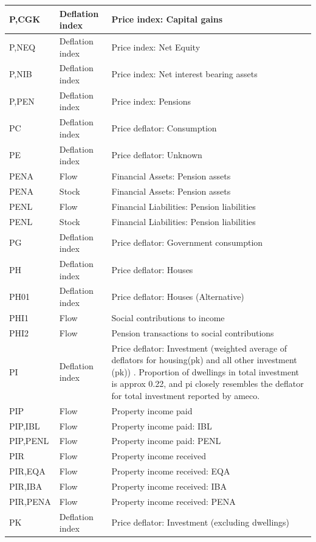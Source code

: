 \documentclass[
]{book}
\begin{document}
\begin{tabular}[t]{l|l|l}
\hline
P,CGK & Deflation index & Price index: Capital gains\\
\hline
P,NEQ & Deflation index & Price index: Net Equity\\
\hline
P,NIB & Deflation index & Price index: Net interest bearing assets\\
\hline
P,PEN & Deflation index & Price index: Pensions\\
\hline
PC & Deflation index & Price deflator: Consumption\\
\hline
PE & Deflation index & Price deflator: Unknown\\
\hline
PENA & Flow & Financial Assets: Pension assets\\
\hline
PENA & Stock & Financial Assets: Pension assets\\
\hline
PENL & Flow & Financial Liabilities: Pension liabilities\\
\hline
PENL & Stock & Financial Liabilities: Pension liabilities\\
\hline
PG & Deflation index & Price deflator: Government consumption\\
\hline
PH & Deflation index & Price deflator: Houses\\
\hline
PH01 & Deflation index & Price deflator: Houses (Alternative)\\
\hline
PHI1 & Flow & Social contributions to income\\
\hline
PHI2 & Flow & Pension transactions to social contributions\\
\hline
PI & Deflation index & Price deflator: Investment (weighted average of deflators for housing(pk) and all other investment (pk)) . Proportion of dwellings in total investment is approx 0.22, and pi closely resembles the deflator for total investment reported by ameco.\\
\hline
PIP & Flow & Property income paid\\
\hline
PIP,IBL & Flow & Property income paid: IBL\\
\hline
PIP,PENL & Flow & Property income paid: PENL\\
\hline
PIR & Flow & Property income received\\
\hline
PIR,EQA & Flow & Property income received: EQA\\
\hline
PIR,IBA & Flow & Property income received: IBA\\
\hline
PIR,PENA & Flow & Property income received: PENA\\
\hline
PK & Deflation index & Price deflator: Investment (excluding dwellings)\\

\end{tabular}
\end{document}
